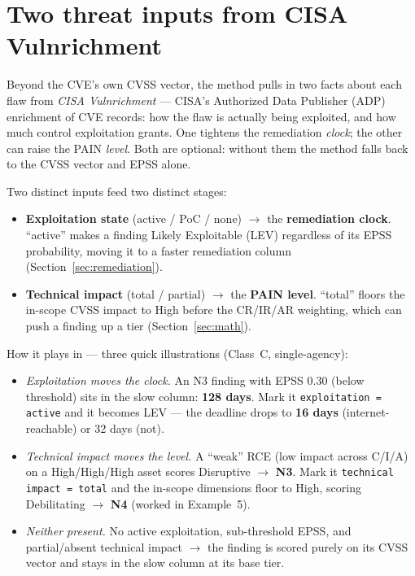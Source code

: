 \documentclass[11pt]{article}
\newcommand{\code}[1]{\texttt{#1}}
\begin{document}
\section{Two threat inputs from CISA Vulnrichment}
\label{sec:enrichment}
\begin{plain}
Beyond the CVE's own CVSS vector, the method pulls in two facts about each flaw from
\emph{CISA Vulnrichment} --- CISA's Authorized Data Publisher (ADP) enrichment of CVE
records: how the flaw is actually being exploited, and how much control exploitation
grants. One tightens the remediation \emph{clock}; the other can raise the PAIN
\emph{level}. Both are optional: without them the method falls back to the CVSS vector
and EPSS alone.
\end{plain}

Two distinct inputs feed two distinct stages:
\begin{itemize}[leftmargin=1.4em]
\item \textbf{Exploitation state} (active / PoC / none) $\rightarrow$ the
  \textbf{remediation clock}. ``active'' makes a finding Likely Exploitable (LEV)
  regardless of its EPSS probability, moving it to a faster remediation column
  (Section~\ref{sec:remediation}).
\item \textbf{Technical impact} (total / partial) $\rightarrow$ the \textbf{PAIN
  level}. ``total'' floors the in-scope CVSS impact to High before the CR/IR/AR
  weighting, which can push a finding up a tier (Section~\ref{sec:math}).
\end{itemize}

\noindent How it plays in --- three quick illustrations (Class~C, single-agency):
\begin{itemize}[leftmargin=1.4em]
\item \emph{Exploitation moves the clock.} An N3 finding with EPSS $0.30$ (below
  threshold) sits in the slow column: \textbf{128 days}. Mark it
  \code{exploitation = active} and it becomes LEV --- the deadline drops to
  \textbf{16 days} (internet-reachable) or 32 days (not).
\item \emph{Technical impact moves the level.} A ``weak'' RCE (low impact across
  C/I/A) on a High/High/High asset scores Disruptive $\rightarrow$ \textbf{N3}. Mark
  it \code{technical impact = total} and the in-scope dimensions floor to High,
  scoring Debilitating $\rightarrow$ \textbf{N4} (worked in Example~5).
\item \emph{Neither present.} No active exploitation, sub-threshold EPSS, and
  partial/absent technical impact $\rightarrow$ the finding is scored purely on its
  CVSS vector and stays in the slow column at its base tier.
\end{itemize}
\end{document}
